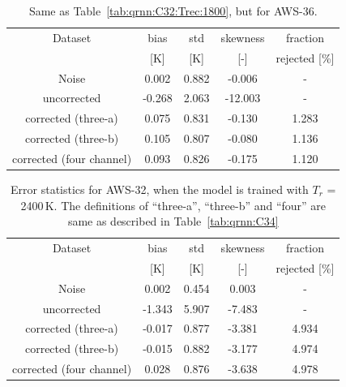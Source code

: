 \documentclass[12pt]{article}
\begin{document}
\begin{table}[!p]
	\centering
	\begin{tabular}[b]{c|c|c|c|c}
		Dataset  		  &   bias &   std &   skewness & fraction  \\
		&   [K]  &   [K] & [-] & rejected [\%]\\
		\hline
Noise                      &  0.002 & 0.882 &             -0.006 &      - \\
uncorrected                & -0.268 & 2.063 &            -12.003 &      - \\
corrected (three-a)        &  0.075 & 0.831 &             -0.130 &      1.283 \\
corrected (three-b)        &  0.105 & 0.807 &             -0.080 &      1.136 \\
corrected (four channel)   &  0.093 & 0.826 &             -0.175 &      1.120 \\
		\hline
	\end{tabular}
	\caption{ Same as Table~\ref{tab:qrnn:C32:Trec:1800}, but for AWS-36.}
	\label{tab:qrnn:C36:Trec:1800}
\end{table}


%
\begin{table}[!p]
	\centering
	\begin{tabular}[b]{c|c|c|c|c}
		Dataset  		  &   bias &   std &   skewness & fraction  \\
		&   [K]  &   [K] & [-] & rejected [\%]\\
		\hline
Noise                       &  0.002 & 0.454 &              0.003 &      - \\
uncorrected                 & -1.343 & 5.907 &             -7.483 &      - \\
corrected (three-a)  		& -0.017 & 0.877 &             -3.381 &      4.934 \\
corrected (three-b)  		& -0.015 & 0.882 &             -3.177 &      4.974 \\
corrected (four channel)    &  0.028 & 0.876 &             -3.638 &      4.978 \\
		\hline
	\end{tabular}
	\caption{ Error statistics for AWS-32, when the model is trained with $T_r$ = 2400\,K. The definitions of ``three-a'', ``three-b'' and ``four'' are same as described in Table~\ref{tab:qrnn:C34}  }
	\label{tab:qrnn:C32:Trec:2400}
\end{table}
\end{document}
